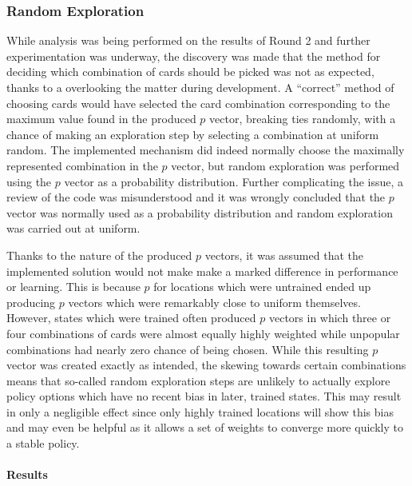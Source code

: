 
\subsubsection*{Random Exploration}
\label{sec:findings-expts-rand}

While analysis was being performed on the results of Round 2 and further
experimentation was underway,
the discovery was made that the method for deciding which combination of cards
should be picked was not as expected,
thanks to a overlooking the matter during development.
%
A ``correct'' method of choosing cards would have selected the card combination
corresponding to the maximum value found in the produced $p$ vector,
breaking ties randomly,
with a chance of making an exploration step by selecting a combination at
uniform random.
%
The implemented mechanism did indeed normally choose the maximally represented
combination in the $p$ vector,
but random exploration was performed using the $p$ vector as a probability
distribution.
%
Further complicating the issue,
a review of the code was misunderstood and it was wrongly concluded that
the $p$ vector was normally used as a probability distribution
and random exploration was carried out at uniform.

Thanks to the nature of the produced $p$ vectors,
it was assumed that the implemented solution would not make make a marked
difference in performance or learning.
%
This is because $p$ for locations which were untrained 
ended up producing $p$ vectors which were remarkably close to
uniform themselves.
%
However,
states which were trained often produced $p$ vectors in which
three or four combinations of cards were almost equally highly weighted
while unpopular combinations had nearly zero chance of being chosen.
%
While this resulting $p$ vector was created exactly as intended,
the skewing towards certain combinations means that so-called
random exploration steps are unlikely to actually explore policy options
which have no recent bias
in later, trained states.
%
This may result in only a negligible effect since
only highly trained locations will show this bias
and may even be helpful as it allows a set of weights to converge more quickly
to a stable policy.


\paragraph*{Results}
\label{sec:findings-expts-rand-results}

